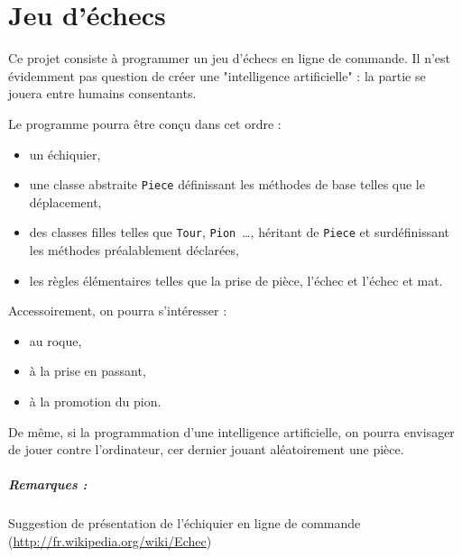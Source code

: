 \documentclass[10pt,a4paper,twoside]{report}
\begin{document}
\renewcommand{\chaptername}{Projet}

\setcounter{chapter}{1}
\chapter{Jeu d'échecs}
\label{projet::jeu_echec}

Ce projet consiste à programmer un jeu d'échecs en ligne de
commande. Il n'est évidemment pas question de créer une "intelligence
artificielle" : la partie se jouera entre humains consentants.

Le programme pourra être conçu dans cet ordre :

\begin{itemize}

\item[\textbullet] un échiquier,

\item[\textbullet] une classe abstraite \lstinline$Piece$ définissant
  les méthodes de base telles que le déplacement,

\item [\textbullet] des classes filles telles que \lstinline$Tour$,
  \lstinline$Pion$~\ldots, héritant de \lstinline$Piece$ et
  surdéfinissant les méthodes préalablement déclarées,

  \item[\textbullet] les règles élémentaires telles que la prise de
    pièce, l'échec et l'échec et mat.
\end{itemize}

Accessoirement, on pourra s'intéresser :

\begin{itemize}

\item[\textbullet] au roque,
\item[\textbullet] à la prise en passant,
\item[\textbullet] à la promotion du pion.

\end{itemize}

De même, si la programmation d'une intelligence artificielle, on
pourra envisager de jouer contre l'ordinateur, cer dernier jouant
aléatoirement une pièce.

\paragraph{Remarques :} Suggestion de présentation de l'échiquier en ligne de commande (\url{http://fr.wikipedia.org/wiki/Echec})
\end{document}
